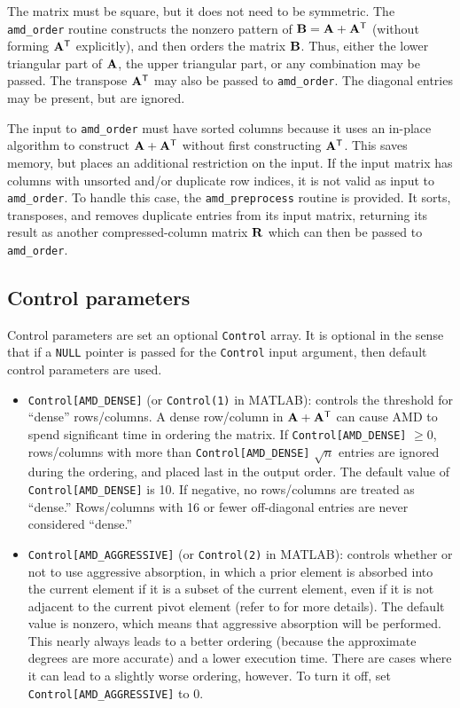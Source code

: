 \documentclass[11pt]{article}
\newcommand{\m}[1]{{\bf{#1}}}       %
\newcommand{\tr}{^{\sf T}}          %
\begin{document}
The matrix must be square, but it does not need to be symmetric.
The {\tt amd\_order} routine constructs the nonzero pattern of
$\m{B} = \m{A}+\m{A}\tr$ (without forming $\m{A}\tr$ explicitly),
and then orders the matrix $\m{B}$.  Thus, either the
lower triangular part of $\m{A}$, the upper triangular part,
or any combination may be passed.  The transpose $\m{A}\tr$ may also be
passed to {\tt amd\_order}.
The diagonal entries may be present, but are ignored.

The input to {\tt amd\_order} must have sorted columns because it uses
an in-place algorithm to construct $\m{A}+\m{A}\tr$ without first constructing
$\m{A}\tr$.  This saves memory, but places an additional restriction on
the input.  If the input matrix has columns with unsorted and/or duplicate
row indices, it is not valid as input to {\tt amd\_order}.  To handle this
case, the {\tt amd\_preprocess} routine is provided.  It sorts, transposes,
and removes duplicate entries from its input matrix, returning its result
as another compressed-column matrix $\m{R}$ which can then be passed to
{\tt amd\_order}.

\subsection{Control parameters}
\label{control_param}

Control parameters are set an optional {\tt Control} array.
It is optional in the sense that if
a {\tt NULL} pointer is passed for the {\tt Control} input argument,
then default control parameters are used.
%
\begin{itemize}
\item {\tt Control[AMD\_DENSE]} (or {\tt Control(1)} in MATLAB):
controls the threshold for ``dense''
rows/columns.  A dense row/column in $\m{A}+\m{A}\tr$
can cause AMD to spend significant time
in ordering the matrix.  If {\tt Control[AMD\_DENSE]} $\ge 0$,
rows/columns with
more than {\tt Control[AMD\_DENSE]} $\sqrt{n}$ entries are ignored during
the ordering, and placed last in the output order.  The default
value of {\tt Control[AMD\_DENSE]} is 10.  If negative, no rows/columns
are treated as ``dense.''  Rows/columns with 16 or fewer off-diagonal
entries are never considered ``dense.''
%
\item {\tt Control[AMD\_AGGRESSIVE]} (or {\tt Control(2)} in MATLAB):
controls whether or not to use
aggressive absorption, in which a prior element is absorbed into the current
element if it is a subset of the current element, even if it is not
adjacent to the current pivot element (refer to \cite{AmestoyDavisDuff96}
for more details).  The default value is nonzero,
which means that aggressive absorption will be performed.  This nearly always
leads to a better ordering (because the approximate degrees are more
accurate) and a lower execution time.  There are cases where it can
lead to a slightly worse ordering, however.  To turn it off, set
{\tt Control[AMD\_AGGRESSIVE]} to 0.
%
\end{itemize}
\end{document}
